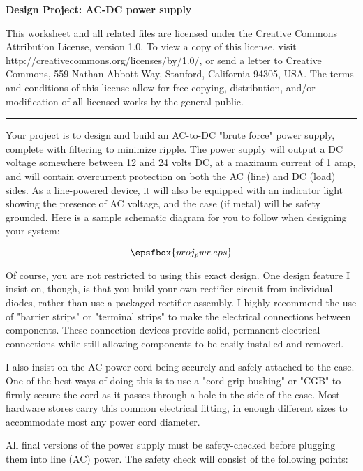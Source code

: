 
\centerline{\bf Design Project: AC-DC power supply} \bigskip 
 
This worksheet and all related files are licensed under the Creative Commons Attribution License, version 1.0.  To view a copy of this license, visit http://creativecommons.org/licenses/by/1.0/, or send a letter to Creative Commons, 559 Nathan Abbott Way, Stanford, California 94305, USA.  The terms and conditions of this license allow for free copying, distribution, and/or modification of all licensed works by the general public.

\bigskip 

\hrule

\vskip 10pt

Your project is to design and build an AC-to-DC "brute force" power supply, complete with filtering to minimize ripple.  The power supply will output a DC voltage somewhere between 12 and 24 volts DC, at a maximum current of 1 amp, and will contain overcurrent protection on both the AC (line) and DC (load) sides.  As a line-powered device, it will also be equipped with an indicator light showing the presence of AC voltage, and the case (if metal) will be safety grounded.  Here is a sample schematic diagram for you to follow when designing your system:

$$\epsfbox{proj_pwr.eps}$$

Of course, you are not restricted to using this exact design.  One design feature I insist on, though, is that you build your own rectifier circuit from individual diodes, rather than use a packaged rectifier assembly.  I highly recommend the use of "barrier strips" or "terminal strips" to make the electrical connections between components.  These connection devices provide solid, permanent electrical connections while still allowing components to be easily installed and removed.

I also insist on the AC power cord being securely and safely attached to the case.  One of the best ways of doing this is to use a "cord grip bushing" or "CGB" to firmly secure the cord as it passes through a hole in the side of the case.  Most hardware stores carry this common electrical fitting, in enough different sizes to accommodate most any power cord diameter.

All final versions of the power supply must be safety-checked before plugging them into line (AC) power.  The safety check will consist of the following points:

